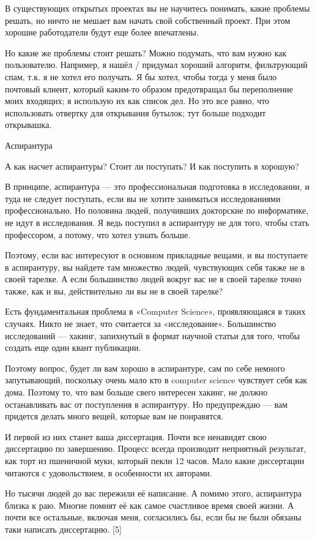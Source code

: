 \documentclass[ebook,12pt,oneside,openany]{memoir}
\begin{document}
В существующих открытых проектах вы не научитесь понимать, какие
проблемы решать, но ничто не мешает вам начать свой собственный
проект. При этом хорошие работодатели будут еще более впечатлены.

Но какие же проблемы стоит решать? Можно подумать, что вам нужно как
пользователю. Например, я нашёл / придумал хороший алгоритм,
фильтрующий спам, т.к. я не хотел его получать. Я бы хотел, чтобы
тогда у меня было почтовый клиент, который каким-то образом
предотвращал бы переполнение моих входящих; я использую их как список
дел. Но это все равно, что использовать отвертку для открывания
бутылок; тут больше подходит открывашка.

Аспирантура

А как насчет аспирантуры? Стоит ли поступать? И как поступить в
хорошую?

В принципе, аспирантура — это профессиональная подготовка в
исследовании, и туда не следует поступать, если вы не хотите
заниматься исследованиями профессионально. Но половина людей,
получивших докторские по информатике, не идут в исследования. Я ведь
поступил в аспирантуру не для того, чтобы стать профессором, а потому,
что хотел узнать больше.

Поэтому, если вас интересуют в основном прикладные вещами, и вы
поступаете в аспирантуру, вы найдете там множество людей, чувствующих
себя также не в своей тарелке. А если большинство людей вокруг вас не
в своей тарелке точно также, как и вы, действительно ли вы не в своей
тарелке?

Есть фундаментальная проблема в «Computer Science», проявляющаяся в
таких случаях. Никто не знает, что считается за «исследование».
Большинство исследований — хакинг, запихнутый в формат научной статьи
для того, чтобы создать еще один квант публикации.

Поэтому вопрос, будет ли вам хорошо в аспирантуре, сам по себе немного
запутывающий, поскольку очень мало кто в computer science чувствует
себя как дома. Поэтому то, что вам больше свего интересен хакинг, не
должно останавливать вас от поступления в аспирантуру. Но предупреждаю
— вам придется делать много вещей, которые вам не понравятся.

И первой из них станет ваша диссертация. Почти все ненавидят свою
диссертацию по завершению. Процесс всегда производит неприятный
результат, как торт из пшеничной муки, который пекли 12 часов. Мало
какие диссертации читаются с удовольствием, в особенности их авторами.

Но тысячи людей до вас пережили её написание. А помимо этого,
аспирантура близка к раю. Многие помнят её как самое счастливое время
своей жизни. А почти все остальные, включая меня, согласились бы, если
бы не были обязаны таки написать диссертацию. [5]
\end{document}
